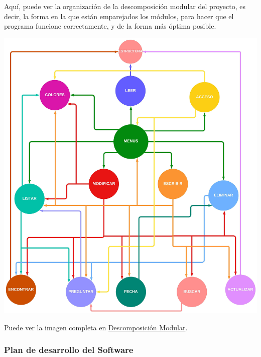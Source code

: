 Aquí, puede ver la organización de la descomposición modular del proyecto, es decir, la forma en la que están emparejados los módulos,
para hacer que el programa funcione correctamente, y de la forma más óptima posible.
\begin{center}
  \includegraphics[width=1.1\textwidth]{FOTOS/Descomposicion_Modular.jpeg}
\end{center}

Puede ver la imagen completa en \href{FOTOS/Descomposicion_Modular.jpeg}{Descomposición Modular}.

\subsubsection{Plan de desarrollo del Software}

\bigskip

